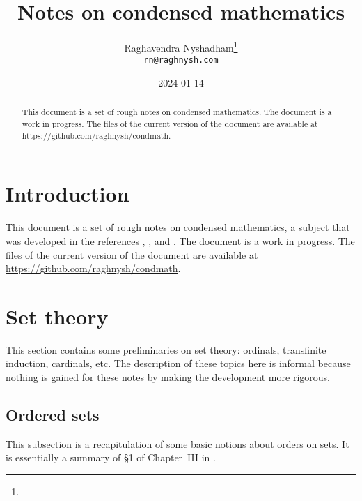 \documentclass{article}
\title{Notes on condensed mathematics}
\author{Raghavendra Nyshadham\thanks{\cczero} \\
  {\normalsize\nolinkurl{rn@raghnysh.com}}}
\date{2024-01-14}
\begin{document}
\begin{titlingpage}
  \maketitle

  \begin{abstract}
    This document is a set of rough notes on condensed mathematics.
    The document is a work in progress.  The files of the current
    version of the document are available at
    \url{https://github.com/raghnysh/condmath}.


  \end{abstract}
\end{titlingpage}

\tableofcontents

\section{Introduction}
\label{sec:113nrd0o}

This document is a set of rough notes on condensed mathematics, a
subject that was developed in the references \textcite{bib:872u2noz},
\textcite{bib:iy49ytm3}, and \textcite{bib:7k2n4jtn}.  The document is
a work in progress.  The files of the current version of the document
are available at \url{https://github.com/raghnysh/condmath}.

\section{Set theory}
\label{sec:pafnta4o}

This section contains some preliminaries on set theory: ordinals,
transfinite induction, cardinals, etc.  The description of these
topics here is informal because nothing is gained for these notes by
making the development more rigorous.

\subsection{Ordered sets}
\label{sec:5f3q5o8v}

This subsection is a recapitulation of some basic notions about orders
on sets.  It is essentially a summary of \S1 of Chapter~III in
\textcite{bib:lmhdqwpw}.
\end{document}
